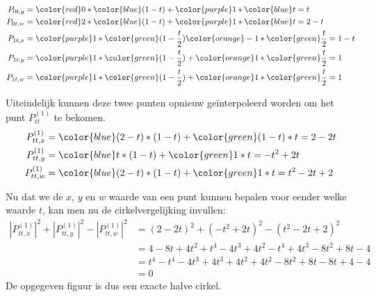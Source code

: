 \begin{enumerate}
{\begin{itemize}
\begin{equation*}
\begin{split}
					P_{0t, y} & = {\color{red}0} *  {\color{blue}(1 - t)} + {\color{purple}1} * {\color{blue}t} = t \\
					P_{0t, w} & = {\color{red}2} *  {\color{blue}(1 - t)} + {\color{purple}1} * {\color{blue}t} = 2 - t\\
					P_{1t, x} & = {\color{purple}1} * {\color{green}(1 - \frac{t}{2})} {\color{orange}- 1} * {\color{green}\frac{t}{2}} = 1 - t \\
					P_{1t, y} & = {\color{purple}1} *  {\color{green}(1 - \frac{t}{2})} + {\color{orange}1} * {\color{green}\frac{t}{2}} = 1 \\
					P_{1t, w} & = {\color{purple}1} *  {\color{green}(1 - \frac{t}{2})} + {\color{orange}1} * {\color{green}\frac{t}{2}} = 1\\
				\end{split}
			\end{equation*}

			Uiteindelijk kunnen deze twee punten opnieuw geïnterpoleerd worden om het punt $P_{tt}^{(1)}$ te bekomen.
			\begin{equation*}
				\begin{split}
					P_{tt, x}^{(1)} & = {\color{blue}(2 - t)} * (1 - t) + {\color{green}(1 - t)} * t  = 2 - 2t \\
					P_{tt, y}^{(1)} & = {\color{blue}t} *  (1 - t) + {\color{green}1} * t = -t^2 + 2t \\
					P_{tt, w}^{(1)} & = {\color{blue}(2 - t)} *  (1 - t) +  {\color{green}1} * t = t^2 - 2t + 2\\
				\end{split}
			\end{equation*}

			Nu dat we de $x$, $y$ en $w$ waarde van een punt kunnen bepalen voor eender welke waarde $t$, kan men nu de cirkelvergelijking invullen:
			\begin{equation*}
				\begin{split}
					|P_{tt, x}^{(1)}|^2 + |P_{tt, y}^{(1)}|^2 - |P_{tt, w}^{(1)}|^2 & = (2 - 2t)^2 + (-t^2 + 2t)^2 - (t^2 - 2t + 2)^2 \\
																  & =  4 - 8t + 4t^2 + t^4 - 4t^3 + 4t^2 - t^4 +4t^3 - 8t^2 + 8t - 4 \\
																  & = t^4 - t^4 - 4t^3 + 4t^3 +4t^2 + 4t^2 - 8t^2 + 8t - 8t + 4 - 4 \\
																  & = 0
				\end{split}
			\end{equation*}
			De opgegeven figuur is dus een exacte halve cirkel.


\end{itemize}}
\end{enumerate}

